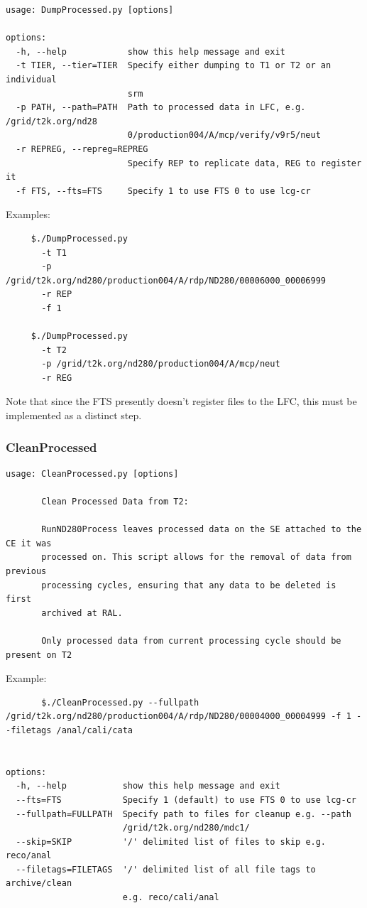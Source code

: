 \documentclass[11pt]{article}
\begin{document}
\begin{verbatim}
usage: DumpProcessed.py [options]

options:
  -h, --help            show this help message and exit
  -t TIER, --tier=TIER  Specify either dumping to T1 or T2 or an individual
                        srm
  -p PATH, --path=PATH  Path to processed data in LFC, e.g. /grid/t2k.org/nd28
                        0/production004/A/mcp/verify/v9r5/neut
  -r REPREG, --repreg=REPREG
                        Specify REP to replicate data, REG to register it
  -f FTS, --fts=FTS     Specify 1 to use FTS 0 to use lcg-cr
\end{verbatim}
Examples:
\begin{verbatim}
     $./DumpProcessed.py 
       -t T1 
       -p /grid/t2k.org/nd280/production004/A/rdp/ND280/00006000_00006999
       -r REP
       -f 1

     $./DumpProcessed.py 
       -t T2 
       -p /grid/t2k.org/nd280/production004/A/mcp/neut
       -r REG
\end{verbatim}

Note that since the FTS presently doesn't register files to the LFC,
this must be implemented as a distinct step.

\subsubsection*{CleanProcessed}

\begin{verbatim}
usage: CleanProcessed.py [options]

       Clean Processed Data from T2:

       RunND280Process leaves processed data on the SE attached to the CE it was
       processed on. This script allows for the removal of data from previous
       processing cycles, ensuring that any data to be deleted is first
       archived at RAL.

       Only processed data from current processing cycle should be present on T2

\end{verbatim}
Example:
\begin{verbatim}
       $./CleanProcessed.py --fullpath /grid/t2k.org/nd280/production004/A/rdp/ND280/00004000_00004999 -f 1 --filetags /anal/cali/cata


options:
  -h, --help           show this help message and exit
  --fts=FTS            Specify 1 (default) to use FTS 0 to use lcg-cr
  --fullpath=FULLPATH  Specify path to files for cleanup e.g. --path
                       /grid/t2k.org/nd280/mdc1/
  --skip=SKIP          '/' delimited list of files to skip e.g. reco/anal
  --filetags=FILETAGS  '/' delimited list of all file tags to archive/clean
                       e.g. reco/cali/anal
\end{verbatim}
\end{document}
